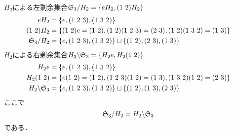 \documentclass[main]{subfiles}
\begin{document}
\begin{ex}
				$H_2$による左剰余集合$\mathfrak{S}_3/H_2=\qty{eH_2,\qty(1\ 2)H_2}$
				\begin{align*}
					eH_2          & =\qty{e,\qty(1\ 2\ 3),\qty(1\ 3\ 2)}                                                                \\
					\qty(1\ 2)H_2 & =\qty{\qty(1\ 2)e=\qty(1\ 2),\qty(1\ 2)\qty(1\ 2\ 3)=\qty(2\ 3),\qty(1\ 2)\qty(1\ 3\ 2)=\qty(1\ 3)} \\
					\frakS_3/H_2  & =\qty{e,\qty(1\ 2\ 3),\qty(1\ 3\ 2)}\sqcup\qty{\qty(1\ 2),\qty(2\ 3),\qty(1\ 3)}                    \\
				\end{align*}
				\noindent $H_2$による右剰余集合$H_2\backslash\frakS_3=\qty{H_2e,H_2\qty(1\ 2)}$
				\begin{align*}
					H_2e                  & =\qty{e,\qty(1\ 2\ 3),\qty(1\ 3\ 2)}                                                                \\
					H_2\qty(1\ 2)         & =\qty{e\qty(1\ 2)=\qty(1\ 2),\qty(1\ 2\ 3)\qty(1\ 2)=\qty(1\ 3),\qty(1\ 3\ 2)\qty(1\ 2)=\qty(2\ 3)} \\
					H_2\backslash\frakS_3 & =\qty{e,\qty(1\ 2\ 3),\qty(1\ 3\ 2)}\sqcup\qty{\qty(1\ 2),\qty(1\ 3),\qty(2\ 3)}                    \\
				\end{align*}
				{\color{red} ここで
				\[\mathfrak{S}_3/H_2= H_2\backslash\mathfrak{S}_3\]
				である．}
			\end{ex}
\end{document}
